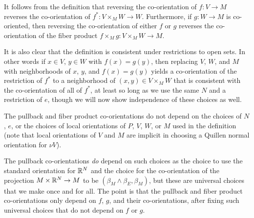 \begin{remark}\label{R: co-or restriction or switch}
	It follows from the definition that reversing the co-orientation of $f \colon V \to M$ reverses the co-orientation of $f^* \colon V \times_M W \to W$.
	Furthermore, if $g \colon W \to M$ is co-oriented, then reversing the co-orientation of either $f$ or $g$ reverses the co-orientation of the fiber product $f \times_M g \colon V \times_M W \to M$.

	It is also clear that the definition is consistent under restrictions to open sets.
	In other words if $x \in V$, $y \in W$ with $f(x) = g(y)$, then replacing $V$, $W$, and $M$ with neighborhoods of $x$, $y$, and $f(x) = g(y)$ yields a co-orientation of the restriction of $f^*$ to a neighborhood of $(x,y) \in V \times_M W$ that is consistent with the co-orientation of all of $f^*$, at least so long as we use the same $N$ and a restriction of $e$, though we will now show independence of these choices as well.
\end{remark}

\begin{lemma}\label{L: pullback co well defined}
	The pullback and fiber product co-orientations do not depend on the choices of $N$, $e$, or the choices of local orientations of $P$, $V$, $W$, or $M$ used in the definition (note that local orientations of $V$ and $M$ are implicit in choosing a Quillen normal orientation for $\nu V$).
\end{lemma}

\begin{remark}
	The pullback co-orientations \textit{do} depend on such choices as the choice to use the standard orientation for $\mathbb{R}^N$ and the choice for the co-orientation of the projection $M \times \mathbb{R}^N \to M$ to be $(\beta_M \wedge \beta_E, \beta_M)$, but these are universal choices that we make once and for all.
	The point is that the pullback and fiber product co-orientations only depend on $f$, $g$, and their co-orientations, after fixing such universal choices that do not depend on $f$ or $g$.
\end{remark}

